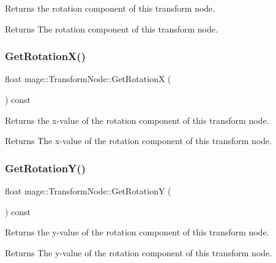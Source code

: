 Returns the rotation component of this transform node.

\begin{DoxyReturn}{Returns}
The rotation component of this transform node. 
\end{DoxyReturn}
\hypertarget{structmage_1_1_transform_node_a590d811929ff63f0caa660036b4e74bb}{}\label{structmage_1_1_transform_node_a590d811929ff63f0caa660036b4e74bb} 
\subsubsection{\texorpdfstring{Get\+Rotation\+X()}{GetRotationX()}}
{\footnotesize\ttfamily float mage\+::\+Transform\+Node\+::\+Get\+RotationX (\begin{DoxyParamCaption}{ }\end{DoxyParamCaption}) const\hspace{0.3cm}{\ttfamily [noexcept]}}

Returns the x-\/value of the rotation component of this transform node.

\begin{DoxyReturn}{Returns}
The x-\/value of the rotation component of this transform node. 
\end{DoxyReturn}
\hypertarget{structmage_1_1_transform_node_aad37033c32302445a8bc0d93b655dae6}{}\label{structmage_1_1_transform_node_aad37033c32302445a8bc0d93b655dae6} 
\subsubsection{\texorpdfstring{Get\+Rotation\+Y()}{GetRotationY()}}
{\footnotesize\ttfamily float mage\+::\+Transform\+Node\+::\+Get\+RotationY (\begin{DoxyParamCaption}{ }\end{DoxyParamCaption}) const\hspace{0.3cm}{\ttfamily [noexcept]}}

Returns the y-\/value of the rotation component of this transform node.

\begin{DoxyReturn}{Returns}
The y-\/value of the rotation component of this transform node. 
\end{DoxyReturn}
\hypertarget{structmage_1_1_transform_node_aba94c2995aae387542cd238d1df446f5}{}\label{structmage_1_1_transform_node_aba94c2995aae387542cd238d1df446f5} 
